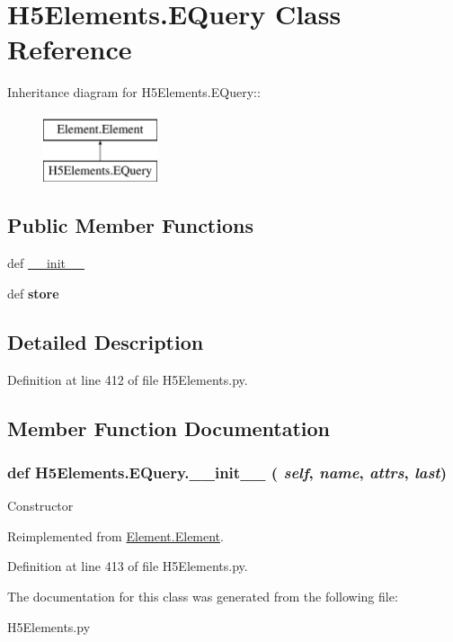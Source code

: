 \hypertarget{classH5Elements_1_1EQuery}{
\section{H5Elements.EQuery Class Reference}
\label{classH5Elements_1_1EQuery}
}
Inheritance diagram for H5Elements.EQuery::\begin{figure}[H]
\begin{center}
\leavevmode
\includegraphics[height=2cm]{classH5Elements_1_1EQuery}
\end{center}
\end{figure}
\subsection*{Public Member Functions}
\begin{DoxyCompactItemize}
\item 
def \hyperlink{classH5Elements_1_1EQuery_a4762ac1d81b6253845dc4a179880ffd9}{\_\-\_\-init\_\-\_\-}
\item 
\hypertarget{classH5Elements_1_1EQuery_a42591031918d8de7cee72a1f66f5da9e}{
def {\bfseries store}}
\label{classH5Elements_1_1EQuery_a42591031918d8de7cee72a1f66f5da9e}

\end{DoxyCompactItemize}


\subsection{Detailed Description}


Definition at line 412 of file H5Elements.py.

\subsection{Member Function Documentation}
\hypertarget{classH5Elements_1_1EQuery_a4762ac1d81b6253845dc4a179880ffd9}{
\subsubsection[{\_\-\_\-init\_\-\_\-}]{\setlength{\rightskip}{0pt plus 5cm}def H5Elements.EQuery.\_\-\_\-init\_\-\_\- ( {\em self}, \/   {\em name}, \/   {\em attrs}, \/   {\em last})}}
\label{classH5Elements_1_1EQuery_a4762ac1d81b6253845dc4a179880ffd9}
\begin{DoxyVerb}Constructor \end{DoxyVerb}
 

Reimplemented from \hyperlink{classElement_1_1Element_a359371465b7c4d21611adec7e86c3b33}{Element.Element}.

Definition at line 413 of file H5Elements.py.

The documentation for this class was generated from the following file:\begin{DoxyCompactItemize}
\item 
H5Elements.py\end{DoxyCompactItemize}
